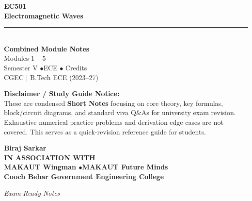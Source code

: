 \documentclass[12pt,a4paper]{article}
\begin{document}
\thispagestyle{empty}


\vspace*{1.0cm}
\begin{center}
  {\Huge\bfseries\color{myred} EC501}\\[10pt]
  {\LARGE\bfseries\color{mydark} Electromagnetic Waves}\\[20pt]
  {\color{myred}\rule{0.7\linewidth}{1.5pt}}\\[18pt]
  {\Large\color{myteal}\textbf{Combined Module Notes}}\\[8pt]
  {\large\color{mydark} Modules 1 -- 5}\\[40pt]
  {\normalsize\color{mydark} Semester V \quad$\bullet$\quad ECE \quad$\bullet$ Credits}\\[12pt]
  {\normalsize\color{mydark} CGEC \;$|$\; B.Tech ECE (2023--27)}
\end{center}
\vspace{1.0cm}
\begin{center}
  \begin{tcolorbox}[colback=mygray, colframe=mgframe, boxrule=0.5pt, arc=3pt, width=0.85\linewidth]
    \centering\small\color{mydark}
    \textbf{Disclaimer / Study Guide Notice:}\\
    These are condensed \textbf{Short Notes} focusing on core theory, key formulas, block/circuit diagrams, and standard viva Q\&As for university exam revision. Exhaustive numerical practice problems and derivation edge cases are not covered. This serves as a quick-revision reference guide for students.
  \end{tcolorbox}
\end{center}
\vfill
\vspace{0.6cm}
\begin{center}
  {\large\bfseries\color{mypurple} Biraj Sarkar}\\[16pt]
  {\footnotesize\color{watermark}\textbf{IN ASSOCIATION WITH}}\\[8pt]
  {\small\bfseries\color{mydark} MAKAUT Wingman \quad$\bullet$\quad MAKAUT Future Minds}\\[12pt]
  {\large\bfseries\color{myteal} Cooch Behar Government Engineering College}
\end{center}
\vfill
\begin{center}{\small\color{watermark}\textit{Exam-Ready Notes}}\end{center}
\clearpage
\end{document}
